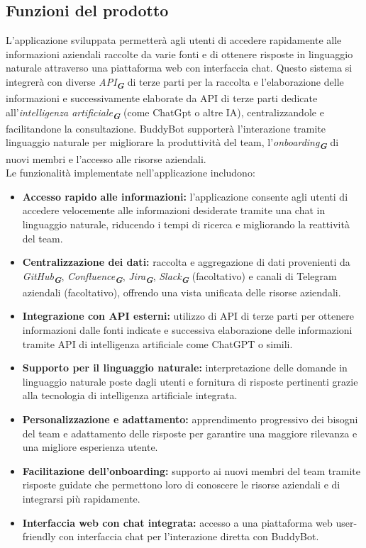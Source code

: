 \subsection{Funzioni del prodotto}
L'applicazione sviluppata permetterà agli utenti di accedere rapidamente alle informazioni aziendali raccolte da varie 
fonti e di ottenere risposte in linguaggio naturale attraverso una piattaforma web con interfaccia chat. Questo sistema 
si integrerà con diverse \emph{API}\textsubscript{\textit{\textbf{G}}}  di terze parti per la raccolta e l'elaborazione delle informazioni e successivamente elaborate
da API  di terze parti dedicate all'\emph{intelligenza artificiale}\textsubscript{\textit{\textbf{G}}}  (come ChatGpt o altre IA), centralizzandole e facilitandone la consultazione. 
BuddyBot supporterà l'interazione tramite linguaggio naturale per migliorare la produttività del team, l'\emph{onboarding}\textsubscript{\textit{\textbf{G}}} di nuovi 
membri e l'accesso alle risorse aziendali.\\
Le funzionalità implementate nell'applicazione includono:
\begin{itemize}
    \item \textbf{Accesso rapido alle informazioni:} l'applicazione consente agli utenti di accedere velocemente alle informazioni desiderate tramite una chat in linguaggio naturale, riducendo i tempi di ricerca e migliorando la reattività del team.
    \item \textbf{Centralizzazione dei dati:} raccolta e aggregazione di dati provenienti da \emph{GitHub}\textsubscript{\textit{\textbf{G}}}, \emph{Confluence}\textsubscript{\textit{\textbf{G}}}, \emph{Jira}\textsubscript{\textit{\textbf{G}}}, \emph{Slack}\textsubscript{\textit{\textbf{G}}} (facoltativo) e canali di Telegram aziendali (facoltativo), offrendo una vista unificata delle risorse aziendali.
    \item \textbf{Integrazione con API esterni:} utilizzo di API di terze parti per ottenere informazioni dalle fonti indicate e successiva elaborazione delle informazioni tramite API di intelligenza artificiale come ChatGPT o simili.
    \item \textbf{Supporto per il linguaggio naturale:} interpretazione delle domande in linguaggio naturale poste dagli utenti e fornitura di risposte pertinenti grazie alla tecnologia di intelligenza artificiale integrata.
    \item \textbf{Personalizzazione e adattamento:} apprendimento progressivo dei bisogni del team e adattamento delle risposte per garantire una maggiore rilevanza e una migliore esperienza utente.
    \item \textbf{Facilitazione dell'onboarding:} supporto ai nuovi membri del team tramite risposte guidate che permettono loro di conoscere le risorse aziendali e di integrarsi più rapidamente.
    \item \textbf{Interfaccia web con chat integrata:} accesso a una piattaforma web user-friendly con interfaccia chat per l'interazione diretta con BuddyBot.
\end{itemize}

